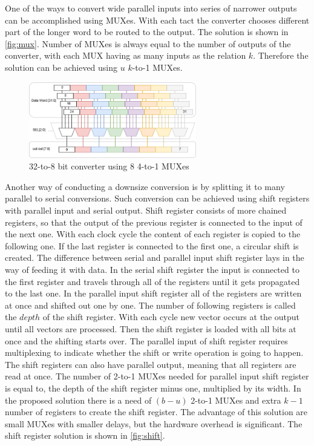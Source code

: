 One of the ways to convert wide parallel inputs into series of narrower outputs can be accomplished using MUXes. With each tact the converter chooses different part of the longer word to be routed to the output. The solution is shown in \autoref{fig:mux}. Number of MUXes is always equal to the number of outputs of the converter, with each MUX having as many inputs as the relation $k$. Therefore the solution can be achieved using $u$ $k$-to-1 MUXes. 

\begin{figure}[h]
\centering
\includegraphics[width=0.65\textwidth]{figures/MUX.png}
\caption{32-to-8 bit converter using 8 4-to-1 MUXes}
\label{fig:mux}
\end{figure}

Another way of conducting a downsize conversion is by splitting it to many parallel to serial conversions. Such conversion can be achieved using shift registers with parallel input and serial output. Shift register consists of more chained registers, so that the output of the previous register is connected to the input of the next one. With each clock cycle the content of each register is copied to the following one. If the last register is connected to the first one, a circular shift is created. The difference between serial and parallel input shift register lays in the way of feeding it with data. In the serial shift register the input is connected to the first register and travels through all of the registers until it gets propagated to the last one. In the parallel input shift register all of the registers are written at once and shifted out one by one. The number of following registers is called the $depth$ of the shift register. With each cycle new vector occurs at the output until all vectors are processed. Then the shift register is loaded with all bits at once and the shifting starts over. The parallel input of shift register requires multiplexing to indicate whether the shift or write operation is going to happen. The shift registers can also have parallel output, meaning that all registers are read at once. The number of 2-to-1 MUXes needed for parallel input shift register is equal to, the depth of the shift register minus one, multiplied by its width. In the proposed solution there is a need of $(b-u)$ 2-to-1 MUXes and extra $k-1$ number of registers to create the shift register. The advantage of this solution are small MUXes with smaller delays, but the hardware overhead is significant. The shift register solution is shown in \autoref{fig:shift}.

